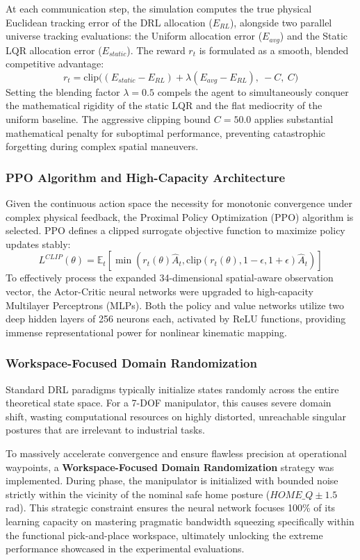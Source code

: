 At each communication step, the simulation computes the true physical Euclidean tracking error of the DRL allocation ($E_{RL}$), 
alongside two parallel universe tracking evaluations: the Uniform allocation error ($E_{avg}$) and the Static LQR allocation error ($E_{static}$). The reward $r_t$ is formulated as a smooth, blended competitive advantage:
\begin{equation}
    r_t = \text{clip}\Big( (E_{static} - E_{RL}) + \lambda (E_{avg} - E_{RL}), \ -C, \ C \Big)
\end{equation}
Setting the blending factor $\lambda = 0.5$ compels the agent to simultaneously conquer the mathematical rigidity of the static LQR and the flat mediocrity of the uniform baseline. 
The aggressive clipping bound $C = 50.0$ applies substantial mathematical penalty for suboptimal performance, preventing catastrophic forgetting during complex spatial maneuvers.
\subsubsection{PPO Algorithm and High-Capacity Architecture}
Given the continuous action space the necessity for monotonic convergence under complex physical feedback, the Proximal Policy Optimization (PPO) 
algorithm is selected. PPO defines a clipped surrogate objective function to maximize policy updates stably:
\begin{equation}
    L^{CLIP}(\theta) = \mathbb{E}_t \left[ \min\left( r_t(\theta)\hat{A}_t, \text{clip}(r_t(\theta), 1-\epsilon, 1+\epsilon)\hat{A}_t \right) \right]
\end{equation}
To effectively process the expanded 34-dimensional spatial-aware observation vector, the Actor-Critic neural networks were upgraded to high-capacity Multilayer Perceptrons (MLPs). 
Both the policy and value networks utilize two deep hidden layers of 256 neurons each, activated by ReLU functions, providing immense representational power for nonlinear kinematic mapping.
\subsubsection{Workspace-Focused Domain Randomization}
Standard DRL paradigms typically initialize states randomly across the entire theoretical state space. 
For a 7-DOF manipulator, this causes severe domain shift, wasting computational resources on highly distorted, unreachable singular postures that are irrelevant to industrial tasks.

To massively accelerate convergence and ensure flawless precision at operational waypoints, a \textbf{Workspace-Focused Domain Randomization} 
strategy was implemented. During  phase, the manipulator is initialized with bounded noise strictly 
within the vicinity of the nominal safe home posture ($HOME\_Q \pm 1.5$ rad).
This strategic constraint ensures the neural network focuses 100\% of its learning capacity on mastering pragmatic bandwidth squeezing specifically within the functional pick-and-place workspace, ultimately unlocking the extreme performance showcased in the experimental evaluations.
